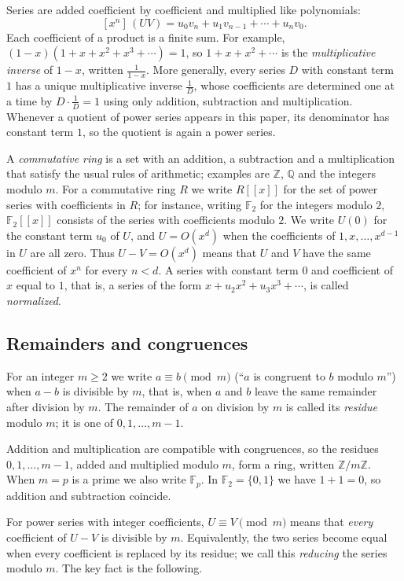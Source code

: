\documentclass[11pt,a4paper]{article}
\theoremstyle{definition}
\theoremstyle{remark}
\newcommand{\Z}{\mathbb{Z}}
\newcommand{\Q}{\mathbb{Q}}
\newcommand{\F}{\mathbb{F}}
\newcommand{\ps}[1]{#1[[x]]}
\newcommand{\coeff}[2]{[x^{#1}]\,#2}
\begin{document}
Series are added coefficient by coefficient and multiplied like polynomials:
\[
\coeff{n}{(UV)}=u_0v_n+u_1v_{n-1}+\cdots+u_nv_0 .
\]
Each coefficient of a product is a finite sum. For example, $(1-x)(1+x+x^2+x^3+\cdots)=1$, so $1+x+x^2+\cdots$ is
the \emph{multiplicative inverse} of $1-x$, written $\frac{1}{1-x}$. More generally, every series $D$ with constant term
$1$ has a unique multiplicative inverse $\frac1D$, whose coefficients are determined one at a time by $D\cdot\frac1D=1$
using only addition, subtraction and multiplication. Whenever a quotient of power series appears in this paper, its
denominator has constant term $1$, so the quotient is again a power series.

A \emph{commutative ring} is a set with an addition, a subtraction and a multiplication that satisfy the usual rules
of arithmetic; examples are $\Z$, $\Q$ and the integers modulo $m$. For a commutative ring $R$ we write $\ps{R}$ for
the set of power series with coefficients in $R$; for instance, writing $\F_2$ for the integers modulo $2$, $\ps{\F_2}$
consists of the series with coefficients modulo $2$. We write
$U(0)$ for the constant term $u_0$ of $U$, and $U=O(x^d)$ when the coefficients of $1,x,\dots,x^{d-1}$ in $U$ are all
zero. Thus $U-V=O(x^d)$ means that $U$ and $V$ have the same coefficient of $x^n$ for every $n<d$. A series with
constant term $0$ and coefficient of $x$ equal to $1$, that is, a series of the form $x+u_2x^2+u_3x^3+\cdots$, is
called \emph{normalized}.

\subsection{Remainders and congruences}
For an integer $m\ge2$ we write $a\equiv b\pmod m$ (``$a$ is congruent to $b$ modulo $m$'') when $a-b$ is divisible by
$m$, that is, when $a$ and $b$ leave the same remainder after division by $m$. The remainder of $a$ on division by
$m$ is called its \emph{residue} modulo $m$; it is one of $0,1,\dots,m-1$.

Addition and multiplication are compatible with congruences, so the residues $0,1,\dots,m-1$, added and multiplied
modulo $m$, form a ring, written $\Z/m\Z$. When $m=p$ is a prime we also write $\F_p$. In $\F_2=\{0,1\}$ we have $1+1=0$,
so addition and subtraction coincide.

For power series with integer coefficients, $U\equiv V\pmod m$ means that \emph{every} coefficient of $U-V$ is
divisible by $m$. Equivalently, the two series become equal when every coefficient is replaced by its residue; we call
this \emph{reducing} the series modulo $m$. The key fact is the following.
\end{document}
